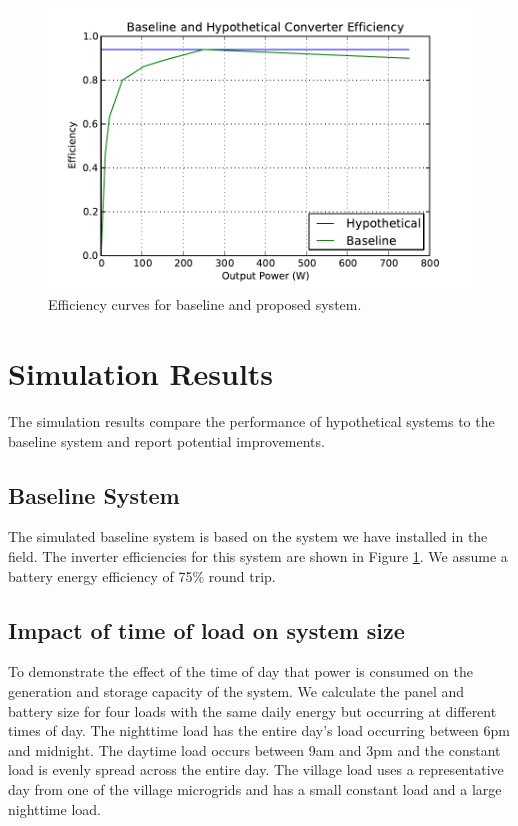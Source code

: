 \documentclass[conference]{IEEEtran}
\begin{document}
\begin{figure}[]
\begin{center}
\includegraphics[width=\columnwidth]{figures/inverter_curves.pdf}
\end{center}
\caption{Efficiency curves for baseline and proposed system.}
\label{inverter_curves}
\end{figure}

\section{Simulation Results}

The simulation results compare the performance of hypothetical
systems to the baseline system and report potential improvements.

\subsection{Baseline System}
The simulated baseline system is based on the system we have
installed in the field.
The inverter efficiencies for this system are shown in Figure
\ref{inverter_curves}.
We assume a battery energy efficiency of 75\% round trip.

\subsection{Impact of time of load on system size}

To demonstrate the effect of the time of day that power 
is consumed on the generation and storage capacity of the system.
We calculate the panel and battery size for four loads with 
the same daily energy but occurring at different times of day.
The nighttime load has the entire day's load occurring between
6pm and midnight.
The daytime load occurs between 9am and 3pm and the constant
load is evenly spread across the entire day.
The village load uses a representative day from one of the 
village microgrids and has a small constant load and a large
nighttime load.
\end{document}
